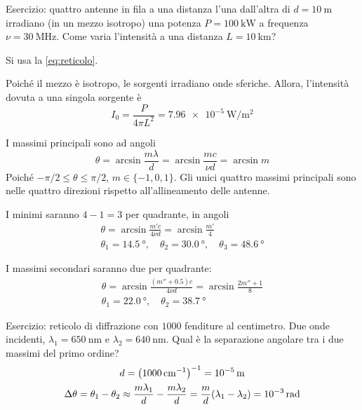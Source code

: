 Esercizio: quattro antenne in fila a una distanza l'una dall'altra di $d = \qty{10}{\metre}$ irradiano (in un mezzo isotropo) una potenza $P = \qty{100}{\kilo\watt}$ a frequenza $\nu = \qty{30}{\mega\hertz}$.
Come varia l'intensità a una distanza $L = \qty{10}{\kilo\metre}$?

Si usa la \eqref{eq:reticolo}.

Poiché il mezzo è isotropo, le sorgenti irradiano onde sferiche.
Allora, l'intensità dovuta a una singola sorgente è
\begin{equation}
    I_0 = \frac{P}{4\pi L^2} = \qty{7.96e-5}{\watt\per\meter\squared}
\end{equation}

I massimi principali sono ad angoli
\begin{equation}
    \theta = \arcsin \frac{m \lambda}{d}
    = \arcsin \frac{m c}{\nu d}
    = \arcsin m
\end{equation}
Poiché $-\pi/2 \le \theta \le \pi/2$, $m \in \{-1, 0, 1\}$.
Gli unici quattro massimi principali sono nelle quattro direzioni rispetto all'allineamento delle antenne.

I minimi saranno $4 - 1 = 3$ per quadrante, in angoli
\begin{gather}
    \theta
    = \arcsin \frac{m' c}{4 \nu d}
    = \arcsin \frac{m'}{4} \\
    \theta_1 = \qty{14.5}{\degree}, \quad
    \theta_2 = \qty{30.0}{\degree}, \quad
    \theta_3 = \qty{48.6}{\degree}
\end{gather}

I massimi secondari saranno due per quadrante:
\begin{gather}
    \theta
    = \arcsin \frac{(m'' + 0.5) c}{4 \nu d}
    = \arcsin \frac{2m'' + 1}{8} \\
    \theta_1 = \qty{22.0}{\degree}, \quad
    \theta_2 = \qty{38.7}{\degree}
\end{gather}


Esercizio: reticolo di diffrazione con $1000$ fenditure al centimetro. Due onde incidenti, $\lambda_1 = \qty{650}{\nano\metre}$ e $\lambda_2 = \qty{640}{\nano\metre}$.
Qual è la separazione angolare tra i due massimi del primo ordine?
\begin{gather}
    d = \left( \qty{1000}{\per\centi\meter} \right)^{-1} = \qty{e-5}{\metre} \\
    \Delta \theta = \theta_1 - \theta_2
    \approx \frac{m \lambda_1}{d} - \frac{m \lambda_2}{d}
    = \frac{m}{d}(\lambda_1 - \lambda_2)
    = \qty{e-3}{\radian}
\end{gather}

